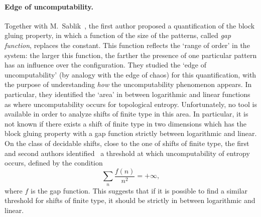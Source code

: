 \documentclass{article}
\begin{document}
\paragraph*{Edge of uncomputability.}
Together with M.~Sablik~\cite{GS18}, the first author proposed a quantification of the block gluing property, in which a function of the size of the patterns, called \textit{gap function}, replaces the constant. This function reflects the `range of order' in the system: the larger this function, the farther the presence of one particular pattern has 
an influence over the configuration. 
They studied the `edge of uncomputability' (by analogy with the edge of chaos) for this quantification, with the purpose of understanding \textit{how} the uncomputability phenomenon appears. 
In particular, they identified the `area' in between 
logarithmic and linear functions as where uncomputability occurs for topological entropy. 
Unfortunately, no tool is available in order to analyze shifts of finite type in this area. In particular, it is not known if there exists a shift of finite type in two 
dimensions which has the block gluing property with a gap function strictly between logarithmic and linear. 
On the class of decidable shifts, close to the one of shifts of finite type, the first and second authors
identified~\cite{GH18} a threshold at which uncomputability of 
entropy occurs, defined by the condition
\[
\sum_n \frac{f(n)}{n^2} = +\infty,
\]
where $f$ is the gap function. This suggests that if it is possible to find a similar threshold for shifts of finite type, it should be strictly in between logarithmic and linear.
\end{document}

